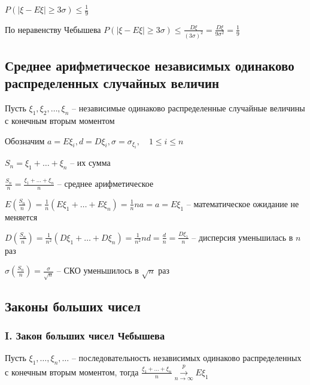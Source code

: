 \documentclass[12pt]{article}
\begin{document}
    \hypertarget{ruleofthreesigmas}{}

    \begin{MyTheorem}
        \Ths $P(|\xi - E\xi| \geq 3\sigma) \leq \frac{1}{9}$
    \end{MyTheorem}

    \begin{MyProof}
        По неравенству Чебышева $P(|\xi - E\xi| \geq 3\sigma) \leq \frac{D\xi}{(3\sigma)^2} = \frac{D\xi}{9\sigma^2} = \frac{1}{9}$
    \end{MyProof}

    \hypertarget{averagevalueofrandomvariables}{}

    \subsection{Среднее арифметическое независимых одинаково распределенных случайных величин}

    Пусть $\xi_1, \xi_2, \dots, \xi_n$ -- независимые одинаково распределенные случайные величины с конечным вторым моментом

    Обозначим $a = E\xi_i, d = D\xi_i, \sigma = \sigma_{\xi_i}, \quad 1 \leq i \leq n$

    $S_n = \xi_1 + \dots + \xi_n$ -- их сумма

    $\frac{S_n}{n} = \frac{\xi_1 + \dots + \xi_n}{n}$ -- среднее арифметическое

    $E\left(\frac{S_n}{n}\right) = \frac{1}{n} (E\xi_1 + \dots + E\xi_n) = \frac{1}{n} na = a = E\xi_1$ -- математическое ожидание не меняется

    $D\left(\frac{S_n}{n}\right) = \frac{1}{n^2} (D\xi_1 + \dots + D\xi_n) = \frac{1}{n^2} nd = \frac{d}{n} = \frac{D\xi_1}{n}$ -- дисперсия уменьшилась в $n$ раз

    $\sigma\left(\frac{S_n}{n}\right) = \frac{\sigma}{\sqrt{n}}$ -- СКО уменьшилось в $\sqrt{n}$ раз

    \subsection{Законы больших чисел}

    \hypertarget{lawofbignumberschebyshev}{}

    \subsubsection{I. Закон больших чисел Чебышева}

    \begin{MyTheorem}
        \Ths Пусть $\xi_1, \dots, \xi_n, \dots$ -- последовательность независимых одинаково распределенных с конечным вторым моментом,
        тогда $\frac{\xi_1 + \dots + \xi_n}{n} \overset{p}{\underset{n \to \infty}{\longrightarrow}} E\xi_1$
    \end{MyTheorem}
\end{document}
